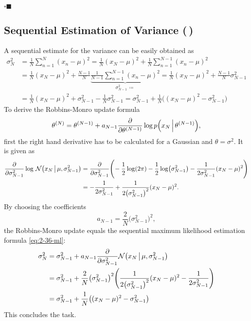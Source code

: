 \documentclass[11pt, a4paper]{scrartcl}
\newcommand{\biggiven}{\,\big\vert\,}
\newcommand{\Biggiven}{\,\Big\vert\,}
\newcommand{\qedeot}{\hfill\(\square\blacksquare\)}
\newcommand{\diffstar}{\texorpdfstring{\raisebox{-1pt}{\resizebox{!}{8pt}{\(\star\)}}}{*}}
\newcommand{\twostar}  {(\diffstar\,\diffstar)}
\begin{document}
			\qedeot

		\subsection{Sequential Estimation of Variance  \twostar}
			A sequential estimate for the variance can be easily obtained as
			\begin{align}
				\sigma_N^2
					&= \frac{1}{N} \sum_{n = 1}^{N} (x_n - \mu)^2
					 = \frac{1}{N} (x_N - \mu)^2 + \frac{1}{N} \sum_{n = 1}^{N - 1} (x_n - \mu)^2 \\
					&= \frac{1}{N} (x_N - \mu)^2 + \frac{N - 1}{N} \underbrace{\frac{1}{N - 1} \sum_{n = 1}^{N - 1} (x_n - \mu)^2}_{\sigma_{N - 1}^2 \,\coloneqq}
					 = \frac{1}{N} (x_N - \mu)^2 + \frac{N - 1}{N} \sigma_{N - 1}^2 \\
					&= \frac{1}{N} (x_N - \mu)^2 + \sigma_{N - 1}^2 - \frac{1}{N} \sigma_{N - 1}^2
					 = \sigma_{N - 1}^2 + \frac{1}{N} \big( (x_N - \mu)^2 - \sigma_{N - 1}^2 \big)  \label{eq:2-36-ml}
			\end{align}
			To derive the Robbins-Monro update formula
			\begin{equation}
				\theta^{(N)} = \theta^{(N - 1)} + a_{N - 1} \pdv{\theta^{(N - 1)}} \log p\Big( x_N \Biggiven \theta^{(N - 1)} \Big),
			\end{equation}
			first the right hand derivative has to be calculated for a Gaussian and \( \theta = \sigma^2 \). It is given as
			\begin{align}
				\pdv{\sigma_{N - 1}^2} \log \, \mathcal{N}\big( x_N \biggiven \mu, \sigma_{N - 1}^2 \big)
					&= \pdv{\sigma_{N - 1}^2} \Bigg(\! -\frac{1}{2} \log(2\pi) - \frac{1}{2} \log(\sigma_{N - 1}^2) - \frac{1}{2 \sigma_{N - 1}^2} (x_N - \mu)^2 \Bigg) \\
					&= -\frac{1}{2 \sigma_{N - 1}^2} + \frac{1}{2 \big( \sigma_{N - 1}^2 \big)^2} (x_N - \mu)^2.
			\end{align}
			By choosing the coefficients
			\begin{equation}
				a_{N - 1} = \frac{2}{N} \big(\sigma_{N - 1}^2\big)^2,
			\end{equation}
			the Robbins-Monro update equals the sequential maximum likelihood estimation formula \eqref{eq:2-36-ml}:
			\begin{align}
				\sigma_{N}^2
					&= \sigma_{N - 1}^2 + a_{N - 1} \pdv{\sigma_{N - 1}^2} \mathcal{N}\big( x_N \biggiven \mu, \sigma_{N - 1}^2 \big) \\
					&= \sigma_{N - 1}^2 + \frac{2}{N} \big(\sigma_{N - 1}^2\big)^2 \Bigg( \frac{1}{2 \big( \sigma_{N - 1}^2 \big)^2} (x_N - \mu)^2 - \frac{1}{2 \sigma_{N - 1}^2} \Bigg) \\
					&= \sigma_{N - 1}^2 + \frac{1}{N} \big( (x_N - \mu)^2 - \sigma_{N - 1}^2 \big)
			\end{align}
			This concludes the task.
\end{document}
